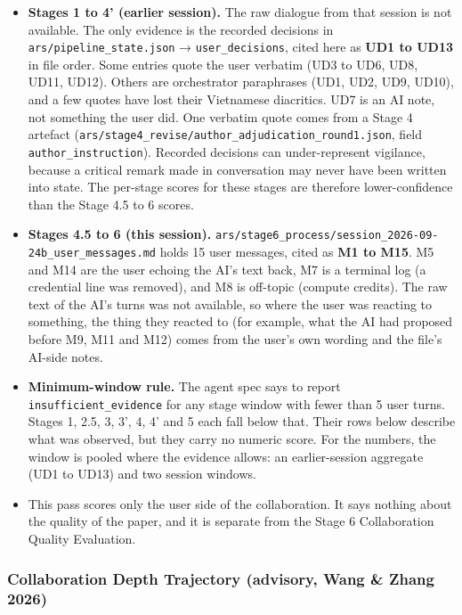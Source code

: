 \documentclass[12pt,a4paper]{article}
\providecommand{\tightlist}{\setlength{\itemsep}{0pt}\setlength{\parskip}{0pt}}
\begin{document}
\begin{itemize}
\tightlist
\item
  \textbf{Stages 1 to 4' (earlier session).} The raw dialogue from that
  session is not available. The only evidence is the recorded decisions
  in \texttt{ars/pipeline\_state.json} → \texttt{user\_decisions}, cited
  here as \textbf{UD1 to UD13} in file order. Some entries quote the
  user verbatim (UD3 to UD6, UD8, UD11, UD12). Others are orchestrator
  paraphrases (UD1, UD2, UD9, UD10), and a few quotes have lost their
  Vietnamese diacritics. UD7 is an AI note, not something the user did.
  One verbatim quote comes from a Stage 4 artefact
  (\texttt{ars/stage4\_revise/author\_adjudication\_round1.json}, field
  \texttt{author\_instruction}). Recorded decisions can under-represent
  vigilance, because a critical remark made in conversation may never
  have been written into state. The per-stage scores for these stages
  are therefore lower-confidence than the Stage 4.5 to 6 scores.
\item
  \textbf{Stages 4.5 to 6 (this session).}
  \texttt{ars/stage6\_process/session\_2026-09-24b\_user\_messages.md}
  holds 15 user messages, cited as \textbf{M1 to M15}. M5 and M14 are
  the user echoing the AI's text back, M7 is a terminal log (a
  credential line was removed), and M8 is off-topic (compute credits).
  The raw text of the AI's turns was not available, so where the user
  was reacting to something, the thing they reacted to (for example,
  what the AI had proposed before M9, M11 and M12) comes from the user's
  own wording and the file's AI-side notes.
\item
  \textbf{Minimum-window rule.} The agent spec says to report
  \texttt{insufficient\_evidence} for any stage window with fewer than 5
  user turns. Stages 1, 2.5, 3, 3', 4, 4' and 5 each fall below that.
  Their rows below describe what was observed, but they carry no numeric
  score. For the numbers, the window is pooled where the evidence
  allows: an earlier-session aggregate (UD1 to UD13) and two session
  windows.
\item
  This pass scores only the user side of the collaboration. It says
  nothing about the quality of the paper, and it is separate from the
  Stage 6 Collaboration Quality Evaluation.
\end{itemize}

\hypertarget{collaboration-depth-trajectory-advisory-wang-zhang-2026}{%
\subsubsection{Collaboration Depth Trajectory (advisory, Wang \& Zhang
2026)}\label{collaboration-depth-trajectory-advisory-wang-zhang-2026}}
\end{document}
